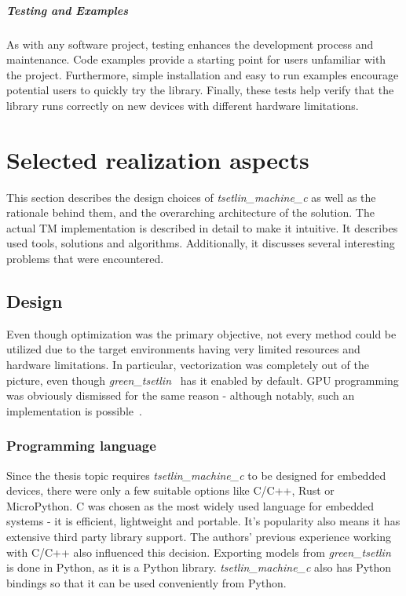 \documentclass[english]{aghengthesis} %
\newcommand*{\LibraryName}{\emph{tsetlin\_machine\_c }}
\newcommand*{\GreenTsetlinName}{\emph{green\_tsetlin}~\cite{glimsdal2024greentsetlin} }
\begin{document}
\paragraph{Testing and Examples}
As with any software project, testing enhances the development process and maintenance. Code examples provide a starting point for users unfamiliar with the project. Furthermore, simple installation and easy to run examples encourage potential users to quickly try the library. Finally, these tests help verify that the library runs correctly on new devices with different hardware limitations.


\chapter{Selected realization aspects}
\label{chap:realization-aspects}


This section describes the design choices of \LibraryName as well as the rationale behind them, and the overarching architecture of the solution. The actual TM implementation is described in detail to make it intuitive. It describes used tools, solutions and algorithms. Additionally, it discusses several interesting problems that were encountered.


\section{Design}
Even though optimization was the primary objective, not every method could be utilized due to the target environments having very limited resources and hardware limitations. In particular, vectorization was completely out of the picture, even though \GreenTsetlinName has it enabled by default. GPU programming was obviously dismissed for the same reason - although notably, such an implementation is possible~\cite{granmo2020pytsetlinmachinecuda}.

\subsection{Programming language}
Since the thesis topic requires \LibraryName to be designed for embedded devices, there were only a few suitable options like C/C++, Rust or MicroPython. C was chosen as the most widely used language for embedded systems - it is efficient, lightweight and portable. It's popularity also means it has extensive third party library support. The authors' previous experience working with C/C++ also influenced this decision.  
Exporting models from \GreenTsetlinName is done in Python, as it is a Python library.  
\LibraryName also has Python bindings so that it can be used conveniently from Python.
\end{document}
